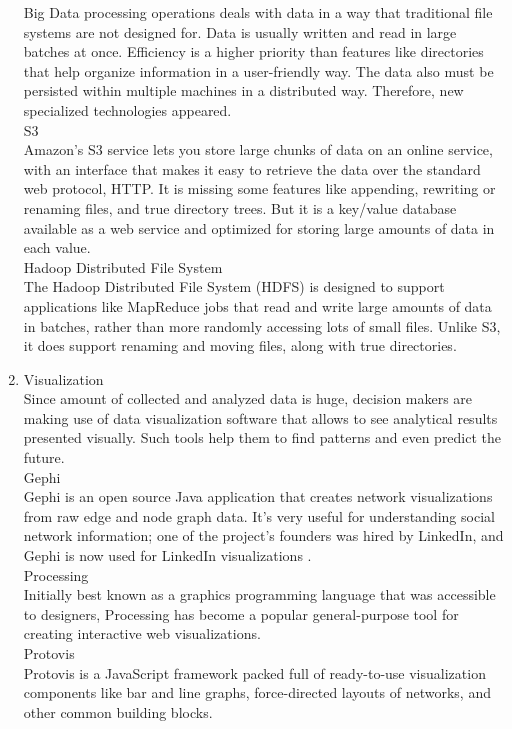\documentclass[runningheads]{llncs}
\begin{document}
\begin{enumerate}
Big Data processing operations deals with data in a way that traditional file systems are not designed for. Data is usually written and read in large batches at once. Efficiency is a higher priority than features like directories that help organize information in a user-friendly way. The data also must be persisted within multiple machines in a distributed way. Therefore, new specialized technologies appeared.\\

S3\\

Amazon's S3 service lets you store large chunks of data on an online service, with an interface that makes it easy to retrieve the data over the standard web protocol, HTTP. It is missing some features like appending, rewriting or renaming files, and true directory trees. But it is a key/value database available as a web service and optimized for storing large amounts of data in each value.\\

Hadoop Distributed File System\\

The Hadoop Distributed File System (HDFS) is designed to support applications like MapReduce jobs that read and write large amounts of data in batches, rather than more randomly accessing lots of small files. Unlike S3, it does support renaming and moving files, along with true directories.\\

\item Visualization\\

Since amount of collected and analyzed data is huge, decision makers are making use of data visualization software that allows to see analytical results presented visually. Such tools help them to find patterns and even predict the future. \\

Gephi\\

Gephi is an open source Java application that creates network visualizations from raw edge and node graph data. It's very useful for understanding social network information; one of the project's founders was hired by LinkedIn, and Gephi is now used for LinkedIn visualizations \cite{GLOSSARY}.\\ 

Processing\\

Initially best known as a graphics programming language that was accessible to designers,
Processing has become a popular general-purpose tool for creating interactive
web visualizations.\\

Protovis\\

Protovis is a JavaScript framework packed full of ready-to-use visualization components
like bar and line graphs, force-directed layouts of networks, and other common
building blocks.

\end{enumerate}
\end{document}
